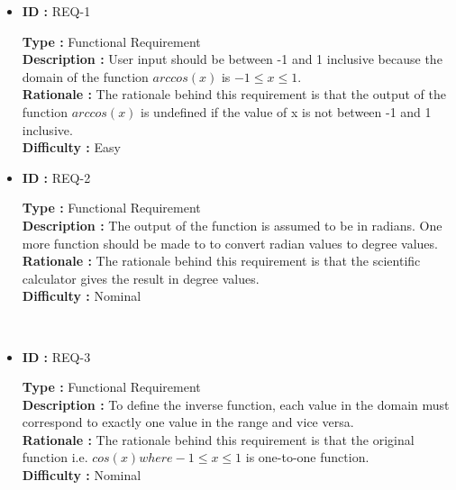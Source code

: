 \documentclass{article}
\begin{document}
\begin{itemize}
\item \textbf{ID \hspace{1.95cm}: } REQ-1
\\
\begin{Large}
 \large \textbf{Type \hspace{1.15cm} : } Functional Requirement
 \\
 \large \textbf{ Description  : }User input should be between -1 and 1 inclusive because the domain of the function $arccos(x)$ is $-1\le x\le1$.
 \\
  \large \textbf{Rationale \hspace{0.4cm}:} The rationale behind this requirement is that the output of the function $arccos(x)$ is undefined if the value of x is not between -1 and 1 inclusive.
 \\
 \large \textbf{Difficulty \hspace{0.45cm}:} Easy
\end{Large}

\item \textbf{ID \hspace{1.95cm}: } REQ-2
\\
\begin{Large}
 \large \textbf{Type \hspace{1.15cm} : } Functional Requirement
 \\
 \large \textbf{ Description  : } The output of the function is assumed to be in radians. One more function should be made to to convert radian values to degree values. 
 \\
  \large \textbf{Rationale \hspace{0.4cm}:} The rationale behind this requirement is that the scientific calculator gives the result in degree values.
 \\
 \large \textbf{Difficulty \hspace{0.45cm}:} Nominal
\end{Large}
\\

\item \textbf{ID \hspace{1.95cm}: } REQ-3
\\
\begin{Large}
 \large \textbf{Type \hspace{1.15cm} : } Functional Requirement
 \\
 \large \textbf{ Description  : } To define the inverse function, each value in the domain must correspond to exactly one value in the range and vice versa. 
 \\
  \large \textbf{Rationale \hspace{0.4cm}:} The rationale behind this requirement is that the original function i.e. $cos(x) where -1\le x\le1$ is one-to-one function. 
 \\
 \large \textbf{Difficulty \hspace{0.45cm}:} Nominal
\end{Large}
\end{itemize}
\end{document}
